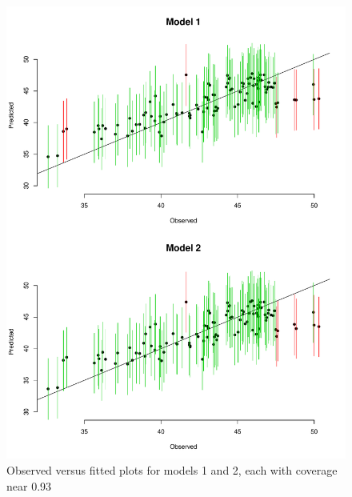 \documentclass[12pt]{article}
\begin{document}
\begin{figure}[ht]
\begin{center}
\includegraphics[scale=0.5]{figs/fit.pdf}
\end{center}
\caption{Observed versus fitted plots for models 1 and 2, each with coverage near 0.93}
\end{figure}
\end{document}
